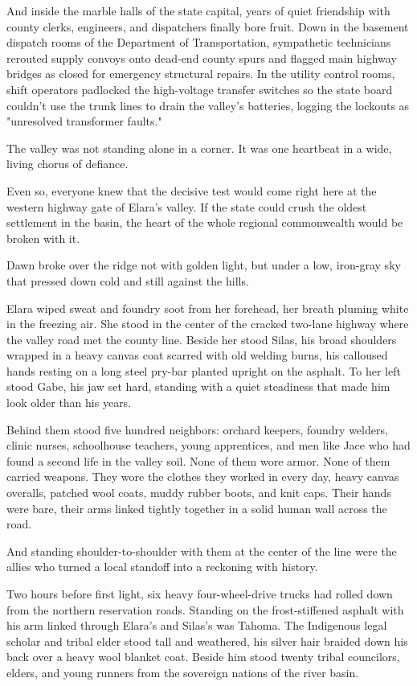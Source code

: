 And inside the marble halls of the state capital, years of quiet friendship with county clerks, engineers, and dispatchers finally bore fruit. Down in the basement dispatch rooms of the Department of Transportation, sympathetic technicians rerouted supply convoys onto dead-end county spurs and flagged main highway bridges as closed for emergency structural repairs. In the utility control rooms, shift operators padlocked the high-voltage transfer switches so the state board couldn't use the trunk lines to drain the valley's batteries, logging the lockouts as "unresolved transformer faults."

The valley was not standing alone in a corner. It was one heartbeat in a wide, living chorus of defiance.

Even so, everyone knew that the decisive test would come right here at the western highway gate of Elara's valley. If the state could crush the oldest settlement in the basin, the heart of the whole regional commonwealth would be broken with it.

Dawn broke over the ridge not with golden light, but under a low, iron-gray sky that pressed down cold and still against the hills. 

Elara wiped sweat and foundry soot from her forehead, her breath pluming white in the freezing air. She stood in the center of the cracked two-lane highway where the valley road met the county line. Beside her stood Silas, his broad shoulders wrapped in a heavy canvas coat scarred with old welding burns, his calloused hands resting on a long steel pry-bar planted upright on the asphalt. To her left stood Gabe, his jaw set hard, standing with a quiet steadiness that made him look older than his years. 

Behind them stood five hundred neighbors: orchard keepers, foundry welders, clinic nurses, schoolhouse teachers, young apprentices, and men like Jace who had found a second life in the valley soil. None of them wore armor. None of them carried weapons. They wore the clothes they worked in every day, heavy canvas overalls, patched wool coats, muddy rubber boots, and knit caps. Their hands were bare, their arms linked tightly together in a solid human wall across the road.

And standing shoulder-to-shoulder with them at the center of the line were the allies who turned a local standoff into a reckoning with history.

Two hours before first light, six heavy four-wheel-drive trucks had rolled down from the northern reservation roads. Standing on the frost-stiffened asphalt with his arm linked through Elara’s and Silas’s was Tahoma. The Indigenous legal scholar and tribal elder stood tall and weathered, his silver hair braided down his back over a heavy wool blanket coat. Beside him stood twenty tribal councilors, elders, and young runners from the sovereign nations of the river basin. 

